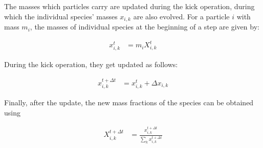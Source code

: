 The masses which particles carry are updated during the kick operation, during which the individual
species' masses $x_{i,k}$ are also evolved. For a particle $i$ with mass $m_i$, the masses of
individual species at the beginning of a step are given by:

\begin{align}
    x_{i,k}^{t} &= m_i X_{i,k}^{t}
\end{align}

During the kick operation, they get updated as follows:

\begin{align}
    x_{i,k}^{t + \Delta t} &= x_{i,k}^{t} + \Delta x_{i,k}
\end{align}

Finally, after the update, the new mass fractions of the species can be obtained using

\begin{align}
X_{i,k}^{t + \Delta t} &= \frac{x_{i,k}^{t + \Delta t}}{\sum_k x_{i,k}^{t + \Delta t}}
\end{align}



